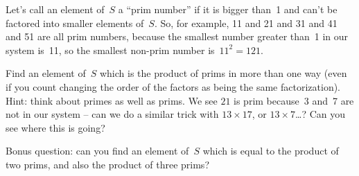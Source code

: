 \documentclass[10pt]{article}
\begin{document}
Let's call an element of~$S$ a ``prim number'' if it is bigger than~1 and can't be factored into smaller elements of~$S$. So, for example, 11 and 21 and 31 and 41 and 51 are all prim numbers, because the smallest number greater than~1 in our system is~11, so the smallest non-prim number is~$11^2=121$.

Find an element of~$S$ which is the product of prims in more than one way (even if you count changing the order of the factors as being the same factorization). Hint: think about primes as well as prims. We see $21$ is prim because~3 and~7 are not in our system -- can we do a similar trick with $13\times17$, or $13\times7$\ldots? Can you see where this is going?

Bonus question: can you find an element of~$S$ which is equal to the product of two prims, and also the product of three prims?
\end{document}
